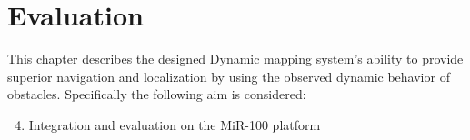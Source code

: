 \chapter{Evaluation}
This chapter describes the designed Dynamic mapping system's ability to provide superior navigation and localization by using the observed dynamic behavior of obstacles.
Specifically the following aim is considered:

\begin{enumerate}
    \setcounter{enumi}{3}
    \item Integration and evaluation on the MiR-100 platform
\end{enumerate}











